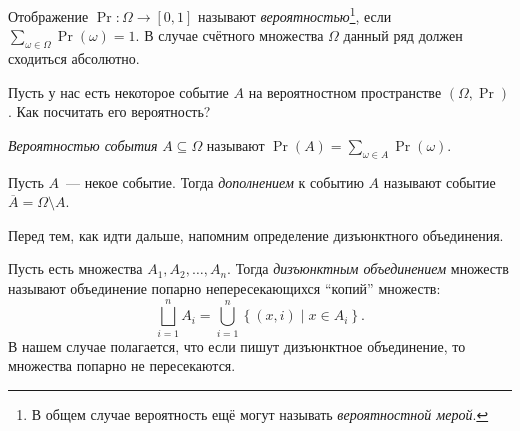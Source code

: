 \begin{definition}
    Отображение \(\Pr : \Omega \to [0, 1]\) называют \emph{вероятностью}\footnote{В общем случае вероятность ещё могут называть \emph{вероятностной мерой}.}, если \(\sum\limits_{\omega \in \Omega} \Pr(\omega) = 1.\) В случае счётного множества \(\Omega\) данный ряд должен сходиться абсолютно.
\end{definition}

Пусть у нас есть некоторое событие \(A\) на вероятностном пространстве \((\Omega, \Pr)\). Как посчитать его вероятность?
\begin{definition}
    \emph{Вероятностью события} \(A \subseteq \Omega\) называют \(\Pr(A) = \sum\limits_{\omega \in A} \Pr(\omega).\)
\end{definition}

\begin{definition}
    Пусть \(A\)~--- некое событие. Тогда \emph{дополнением} к событию \(A\) называют событие \(\overline{A} = \Omega \setminus A\).
\end{definition}

Перед тем, как идти дальше, напомним определение дизъюнктного объединения.
\begin{definition}
    Пусть есть множества \(A_1, A_2, \ldots, A_n\). Тогда \emph{дизъюнктным объединением} множеств называют объединение попарно непересекающихся ``копий'' множеств: \[\bigsqcup_{i = 1}^{n} A_i = \bigcup_{i = 1}^{n} \left\{(x, i) \mid x \in A_i\right\}.\] В нашем случае полагается, что если пишут дизъюнктное объединение, то множества попарно не пересекаются.
\end{definition}

